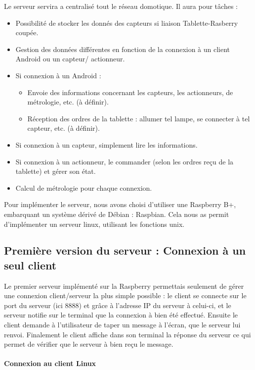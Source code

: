 \documentclass[a4paper,10pt]{article}
\begin{document}
Le serveur servira a centralisé tout le réseau domotique. Il aura pour tâches : \\
\begin{itemize}
	\item Possibilité de stocker les donnés des capteurs si liaison Tablette-Rasberry coupée.
	\item Gestion des données différentes en fonction de la connexion à un client Android ou un capteur/	actionneur. 
	\item Si connexion à un Android : 
		\begin{itemize}
			\item Envoie des informations concernant les capteurs, les actionneurs, de métrologie, etc. (à définir).
			\item Réception des ordres de la tablette : allumer tel lampe, se connecter à tel capteur, etc. (à définir).
		\end{itemize}
	\item Si connexion à un capteur, simplement lire les informations.
	\item Si connexion à un actionneur, le commander (selon les ordres reçu de la tablette) et gérer son état.
	\item Calcul de métrologie pour chaque connexion.
\end{itemize}

Pour implémenter le serveur, nous avons choisi d'utiliser une Raspberry B+, embarquant un système dérivé de Débian : Raspbian. Cela nous as permit d'implémenter un serveur linux, utilisant les fonctions unix.

\subsection{Première version du serveur : Connexion à un seul client}

Le premier serveur implémenté sur la Raspberry permettais seulement de gérer une connexion client/serveur la plus simple possible : le client se connecte sur le port du serveur (ici 8888) et grâce à l'adresse IP du serveur à celui-ci, et le serveur notifie sur le terminal que la connexion à bien été effectué. Ensuite le client demande à l'utilisateur de taper un message à l'écran, que le serveur lui renvoi. Finalement le client affiche dans son terminal la réponse du serveur ce qui permet de vérifier que le serveur à bien reçu le message.

\paragraph{Connexion au client Linux}
\end{document}
